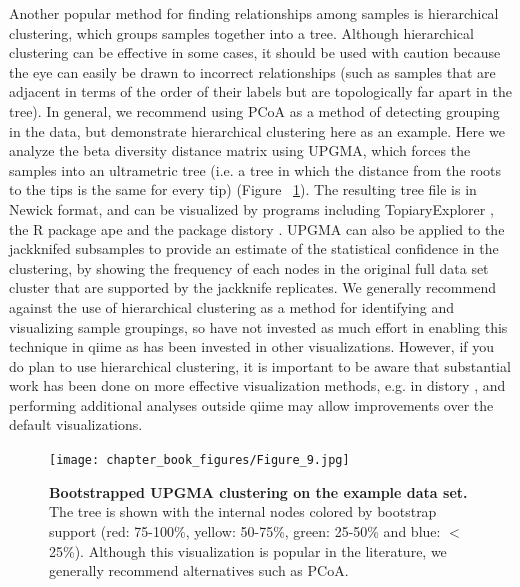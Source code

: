Another popular method for finding relationships among samples is hierarchical clustering,
which groups samples together into a tree. Although hierarchical clustering can be effective
in some cases, it should be used with caution because the eye can easily be drawn to incorrect
relationships (such as samples that are adjacent in terms of the order of their labels but are topologically
far apart in the tree). In general, we recommend using PCoA as a method of detecting grouping in the data,
but demonstrate hierarchical clustering here as an example. Here we analyze the beta diversity
distance matrix using UPGMA, which forces the samples into an ultrametric tree (i.e. a tree in
which the distance from the roots to the tips is the same for every tip) (Figure ~\ref{bfigure9}).
The resulting tree file is in Newick format, and can be visualized by programs including
TopiaryExplorer \cite{Pirrung2011}, the R package ape \cite{Paradis2004} and the package
distory \cite{Chakerian2012}. UPGMA can also be applied to the jackknifed subsamples to
provide an estimate of the statistical confidence in the clustering, by showing the
frequency of each nodes in the original full data set cluster that are supported by the
jackknife replicates. We generally recommend against the use of hierarchical clustering
as a method for identifying and visualizing sample groupings, so have not invested as
much effort in enabling this technique in \gls{qiime} as has been invested in other
visualizations. However, if you do plan to use hierarchical clustering, it is important
to be aware that substantial work has been done on more effective visualization
methods, e.g. in distory \cite{Chakerian2012}, and performing additional analyses
outside \gls{qiime} may allow improvements over the default visualizations.

\begin{figure}[htbp]
\texttt{[image: chapter\_book\_figures/Figure\_9.jpg]}
\caption[Bootstrapped UPGMA clustering on the example data set]{\textbf{Bootstrapped UPGMA clustering on the example data set.}
The tree is shown with the internal nodes colored by bootstrap support (red: 75-100\%,
yellow: 50-75\%, green: 25-50\% and blue: $<$ 25\%). Although this visualization
is popular in the literature, we generally recommend alternatives such as PCoA.}
\label{bfigure9}
\end{figure}

